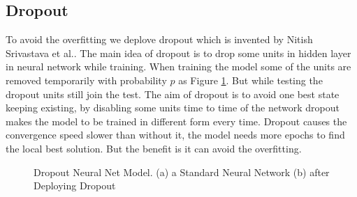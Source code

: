 \subsection{Dropout}
To avoid the overfitting we deplove dropout which is invented by Nitish Srivastava et al.\cite{srivastava2014dropout}. The main idea of dropout is to drop some units in hidden layer in neural network while training. When training the model some of the units are removed temporarily with probability $p$ as Figure \ref{fig:Dropout}. But while testing the dropout units still join the test. The aim of dropout is to avoid one best state keeping existing, by disabling some units time to time of the network dropout makes the model to be trained in different form every time. Dropout causes the convergence speed slower than without it, the model needs more epochs to find the local best solution. But the benefit is it can avoid the overfitting. 
\begin{figure}[!h]

  \centering


\caption{Dropout Neural Net Model. (a) a Standard Neural Network (b) after Deploying Dropout  }
\label{fig:Dropout}
\end{figure}

